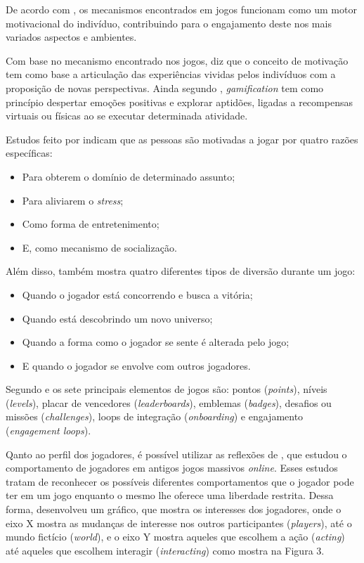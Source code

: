 \documentclass[
	12pt,				%
	openany,			%
	oneside,			%
	a4paper,			%
	english,			%
	french,				%
	spanish,			%
	brazil				%
	]{abntex2}
\begin{document}
	De acordo com , os mecanismos encontrados em jogos funcionam como um motor motivacional do indivíduo, contribuindo para o engajamento deste nos mais variados aspectos e ambientes.

Com base no mecanismo encontrado nos jogos,  diz que o conceito de motivação tem como base a articulação das experiências vividas pelos indivíduos com a proposição de novas perspectivas. Ainda segundo , \textit{gamification} tem como princípio despertar emoções positivas e explorar aptidões, ligadas a recompensas virtuais ou físicas ao se executar determinada atividade.

	Estudos feito por  indicam que as pessoas são motivadas a jogar por quatro razões específicas:
\begin{itemize}
\item Para obterem o domínio de determinado assunto;
\item Para aliviarem o \textit{stress};
\item Como forma de entretenimento;
\item E, como mecanismo de socialização.
\end{itemize}

	Além disso,  também mostra quatro diferentes tipos de diversão durante um jogo:
\begin{itemize}
\item Quando o jogador está concorrendo e busca a vitória;
\item Quando está descobrindo um novo universo;
\item Quando a forma como o jogador se sente é alterada pelo jogo;
\item E quando o jogador se envolve com outros jogadores.
\end{itemize}

	Segundo  e  os sete principais elementos de jogos são: pontos (\textit{points}), níveis (\textit{levels}), placar de vencedores (\textit{leaderboards}), emblemas (\textit{badges}), desafios ou missões (\textit{challenges}), loops de integração (\textit{onboarding}) e engajamento (\textit{engagement loops}). 

	Qanto ao perfil dos jogadores, é possível utilizar as reflexões de , que estudou o comportamento de jogadores em antigos jogos massivos \textit{online}. Esses estudos tratam de reconhecer os possíveis diferentes comportamentos que o jogador pode ter em um jogo enquanto o mesmo lhe oferece uma liberdade restrita.  Dessa forma,  desenvolveu um gráfico, que mostra os interesses dos jogadores, onde o eixo X mostra as mudanças de interesse nos outros participantes (\textit{players}), até o mundo fictício (\textit{world}), e o eixo Y mostra aqueles que escolhem a ação (\textit{acting}) até aqueles que escolhem interagir (\textit{interacting}) como mostra na Figura 3.
\end{document}
